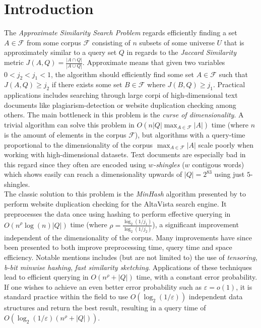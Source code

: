 \section{Introduction}
The \textit{Approximate Similarity Search Problem} regards efficiently finding a set $A\in \mathcal{F}$ from some corpus $\mathcal{F}$ consisting of $n$ subsets of some universe $U$ that is approximately similar to a query set $Q$ in regards to the \textit{Jaccard Similarity} metric $J(A,Q) = \frac{|A\cap Q|}{|A\cup Q|}$\cite{dahlgaard2017fast}\cite{fast-similarity-search}. Approximate means that given two variables $0 < j_2 < j_1 < 1$, the algorithm should efficiently find some set $A\in \mathcal{F}$ such that $J(A, Q) \geq j_2$ if there exists some set $B\in \mathcal{F}$ where $J(B,Q)\geq j_1$.
Practical applications includes searching through large corpi of high-dimensional text documents like plagiarism-detection or website duplication checking among others\cite{vassilvitskii2018}. The main bottleneck in this problem is the \textit{curse of dimensionality}. 
A trivial algorithm can solve this problem in $O(n|Q|\max_{A\in \mathcal{F}}{|A|})$ time (where $n$ is the amount of elements in the corpus $\mathcal{F}$), but algorithms with a query-time proportional to the dimensionality of the corpus $\max_{A\in \mathcal{F}}|A|$ scale poorly when working with high-dimensional datasets. 
Text documents are especially bad in this regard since they often are encoded using \textit{$w$-shingles} ($w$ contigous words) which \citet{li2011hashing} shows easily can reach a dimensionality upwards of $|Q|=2^{83}$ using just $5$-shingles.\\
The classic solution to this problem is the \textit{MinHash} algorithm presented by \citet{broder1997minhash} to perform website duplication checking for the AltaVista search engine. 
It preprocesses the data once using hashing to perform effective querying in $O(n^\rho\log(n)|Q|)$ time (where $\rho = \frac{\log_2{(1/j_1)}}{\log_2{(1/j_2)}}$), a significant improvement independent of the dimensionality of the corpus.
Many improvements have since been presented to both improve preprocessing time, query time and space efficiency. 
Notable mentions includes (but are not limited to) the use of \textit{tensoring}\cite{andoni2006efficient}, \textit{b-bit minwise hashing}\cite{ping2011theory}, \textit{fast similarity sketching}\cite{dahlgaard2017fast}. 
Applications of these techniques lead to efficient querying in $O(n^\rho + |Q|)$ time, with a constant error probability. If one wishes to achieve an even better error probability such as $\varepsilon = o(1)$, it is standard practice within the field to use $O(\log_2(1/\varepsilon))$ independent data structures and return the best result, resulting in a query time of $O(\log_2(1/\varepsilon) (n^\rho + |Q|))$. 

